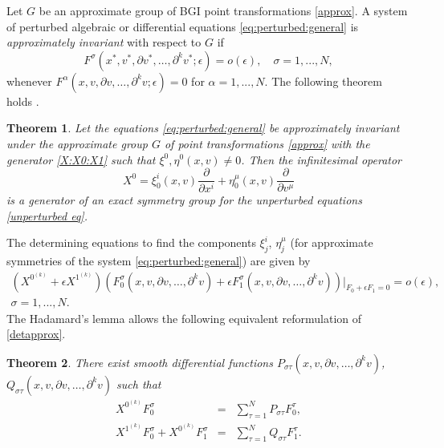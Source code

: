 \documentclass[11pt,letter,subeqn]{article}
\def\barr{\begin{array}{ll}}
\def\earr{\end{array}}
\newtheorem{theorem}{Theorem}[section]
\begin{document}
Let $G$ be an approximate group of BGI point transformations \eqref{approx}. A system of perturbed algebraic or differential equations \eqref{eq:perturbed:general}
is \textit{approximately invariant} with respect to $G$ if
\[
F^\sigma(x^*,v^*,\partial v^*,\ldots, \partial^k v^*;\epsilon)=o(\epsilon), \quad \sigma=1,...,N,
\]
whenever $F^{\alpha}(x,v,\partial v,\ldots, \partial^k v;\epsilon)=0$ for $\alpha=1,...,N$. The following theorem holds \cite{ibragimov1995crc}.
\begin{theorem}\label{1002}
Let the equations \eqref{eq:perturbed:general} be approximately invariant under the approximate group $G$ of point transformations \eqref{approx} with the generator \eqref{X:X0:X1}
such that $\xi^0, \eta^0(x,v) \neq 0$. Then the infinitesimal operator
\begin{equation}\label{60}
X^0=\xi_0^i(x,v)\dfrac{\partial}{\partial x^i}+ \eta_0^\mu(x,v)\dfrac{\partial}{\partial v^\mu}
\end{equation}
is a generator of an exact symmetry group for the unperturbed equations \eqref{unperturbed eq}.
\end{theorem}
The determining equations to find the components $\xi_j^i$, $\eta_j^\mu$ (for approximate symmetries of the system \eqref{eq:perturbed:general}) are given by
\begin{equation}\label{detapprox}
\barr
    (X^{0^{(k)}}+\epsilon X^{1^{(k)}})(F_0^{\sigma}(x,v,\partial v,\ldots, \partial^k v)+\epsilon F_1^{\sigma}(x,v,\partial v,\ldots, \partial^k v))\bigg |_{F_0+\epsilon
    F_1=0}=o(\epsilon),\\[2ex]
    \sigma=1,...,N.
\earr
\end{equation}
The Hadamard's lemma \cite{olver2000applications} allows the following equivalent reformulation of \eqref{detapprox}.
\begin{theorem}
There exist smooth differential functions $P_{\sigma \tau}(x,v,\partial v,\ldots, \partial^k v)$, $Q_{\sigma \tau}(x,v,\partial v,\ldots, \partial^k v)$ such that
\begin{eqnarray}
X^{0^{(k)}}F_0^\sigma &=& \sum_{\tau=1}^{N} P_{\sigma \tau} F_0^\tau,\label{3000} \\
X^{1^{(k)}}F_0^\sigma+ X^{0^{(k)}}F_1^\sigma &=& \sum_{\tau=1}^{N} Q_{\sigma \tau} F_1^\tau.\label{300}
\end{eqnarray}
\end{theorem}
\end{document}
